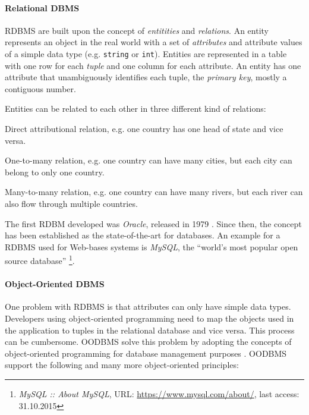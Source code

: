 \paragraph{Relational DBMS} %
\label{par:relational_dbms}

RDBMS are built upon the concept of \emph{entitities} and \emph{relations}. An entity represents an object in the real world with a set of \emph{attributes} and attribute values of a simple data type (e.g. \texttt{string} or \texttt{int}). Entities are represented in a table with one row for each \emph{tuple} and one column for each attribute. An entity has one attribute that unambiguously identifies each tuple, the \emph{primary key}, mostly a contiguous number.

Entities can be related to each other in three different kind of relations:
\begin{compactenum}
  \item[\texttt{1:1}] Direct attributional relation, e.g. one country has one head of state and vice versa.
  \item[\texttt{1:n}] One-to-many relation, e.g. one country can have many cities, but each city can belong to only one country.
  \item[\texttt{m:n}] Many-to-many relation, e.g. one country can have many rivers, but each river can also flow through multiple countries.
\end{compactenum}

The first RDBM developed was \emph{Oracle}, released in 1979 \cite{oracleDB}. Since then, the concept has been established as the state-of-the-art for databases. An example for a RDBMS used for Web-bases systems is \emph{MySQL}, the ``world's most popular open source database''
\footnote{
  \emph{MySQL :: About MySQL},
  URL: \url{https://www.mysql.com/about/},
  last access: 31.10.2015
}.


\paragraph{Object-Oriented DBMS} %
\label{par:object_oriented_dbms}

One problem with RDBMS is that attributes can only have simple data types. Developers using object-oriented programming need to map the objects used in the application to tuples in the relational database and vice versa. This process can be cumbersome. OODBMS solve this problem by adopting the concepts of object-oriented programming for database management purposes
\cite{oodbms}.
OODBMS support the following and many more object-oriented principles:

